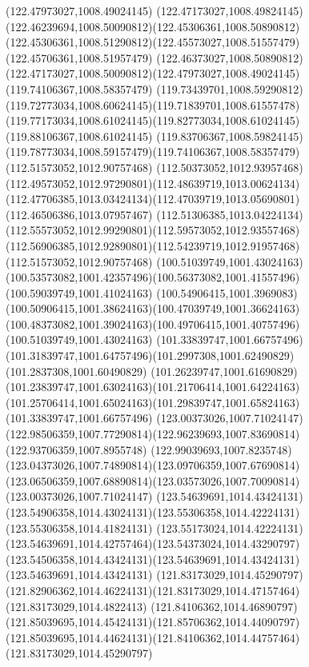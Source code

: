 {{  \moveto(122.47973027,1008.49024145)
  \curveto(122.47173027,1008.49824145)(122.46239694,1008.50090812)(122.45306361,1008.50890812)
  \curveto(122.45306361,1008.51290812)(122.45573027,1008.51557479)(122.45706361,1008.51957479)
  \curveto(122.46373027,1008.50890812)(122.47173027,1008.50090812)(122.47973027,1008.49024145)
  \moveto(119.74106367,1008.58357479)
  \curveto(119.73439701,1008.59290812)(119.72773034,1008.60624145)(119.71839701,1008.61557478)
  \curveto(119.77173034,1008.61024145)(119.82773034,1008.61024145)(119.88106367,1008.61024145)
  \curveto(119.83706367,1008.59824145)(119.78773034,1008.59157479)(119.74106367,1008.58357479)
  \moveto(112.51573052,1012.90757468)
  \curveto(112.50373052,1012.93957468)(112.49573052,1012.97290801)(112.48639719,1013.00624134)
  \curveto(112.47706385,1013.03424134)(112.47039719,1013.05690801)(112.46506386,1013.07957467)
  \curveto(112.51306385,1013.04224134)(112.55573052,1012.99290801)(112.59573052,1012.93557468)
  \curveto(112.56906385,1012.92890801)(112.54239719,1012.91957468)(112.51573052,1012.90757468)
  \moveto(100.51039749,1001.43024163)
  \curveto(100.53573082,1001.42357496)(100.56373082,1001.41557496)(100.59039749,1001.41024163)
  \curveto(100.54906415,1001.3969083)(100.50906415,1001.38624163)(100.47039749,1001.36624163)
  \curveto(100.48373082,1001.39024163)(100.49706415,1001.40757496)(100.51039749,1001.43024163)
  \moveto(101.33839747,1001.66757496)
  \curveto(101.31839747,1001.64757496)(101.2997308,1001.62490829)(101.2837308,1001.60490829)
  \curveto(101.26239747,1001.61690829)(101.23839747,1001.63024163)(101.21706414,1001.64224163)
  \curveto(101.25706414,1001.65024163)(101.29839747,1001.65824163)(101.33839747,1001.66757496)
  \moveto(123.00373026,1007.71024147)
  \curveto(122.98506359,1007.77290814)(122.96239693,1007.83690814)(122.93706359,1007.8955748)
  \curveto(122.99039693,1007.8235748)(123.04373026,1007.74890814)(123.09706359,1007.67690814)
  \curveto(123.06506359,1007.68890814)(123.03573026,1007.70090814)(123.00373026,1007.71024147)
  \moveto(123.54639691,1014.43424131)
  \curveto(123.54906358,1014.43024131)(123.55306358,1014.42224131)(123.55306358,1014.41824131)
  \curveto(123.55173024,1014.42224131)(123.54639691,1014.42757464)(123.54373024,1014.43290797)
  \curveto(123.54506358,1014.43424131)(123.54639691,1014.43424131)(123.54639691,1014.43424131)
  \moveto(121.83173029,1014.45290797)
  \curveto(121.82906362,1014.46224131)(121.83173029,1014.47157464)(121.83173029,1014.4822413)
  \curveto(121.84106362,1014.46890797)(121.85039695,1014.45424131)(121.85706362,1014.44090797)
  \curveto(121.85039695,1014.44624131)(121.84106362,1014.44757464)(121.83173029,1014.45290797)
}}
